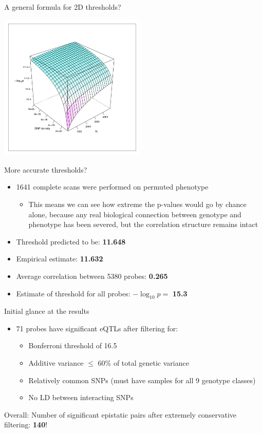 \documentclass{beamer}
\begin{document}
\begin{frame}{A general formula for 2D thresholds?}
	\begin{center}
		\includegraphics[height=7cm]{threshold_function.pdf}
	\end{center}
\end{frame}


\begin{frame}{More accurate thresholds?}
	\begin{itemize}
		\item 1641 complete scans were performed on permuted phenotype
		\begin{itemize}
			\item This means we can see how extreme the p-values would go by chance alone, because any real biological connection between genotype and phenotype has been severed, but the correlation structure remains intact
		\end{itemize}
		\item Threshold predicted to be: \textbf{11.648}
		\item Empirical estimate: \textbf{11.632}
		\item Average correlation between 5380 probes: \textbf{0.265}
		\item Estimate of threshold for all probes: $-\log_{10}p =$ \textbf{15.3}
	\end{itemize}
\end{frame}


\begin{frame}{Initial glance at the results}
	\begin{itemize}
		\item 71 probes have significant eQTLs after filtering for:
		\begin{itemize}
			\item Bonferroni threshold of 16.5
			\item Additive variance $\leq$ 60\% of total genetic variance
			\item Relatively common SNPs (must have samples for all 9 genotype classes)
			\item No LD between interacting SNPs
		\end{itemize}
	\end{itemize}
	\begin{block}{Overall:}
		Number of significant epistatic pairs after extremely conservative filtering: \textbf{140}!
	\end{block}
\end{frame}
\end{document}
